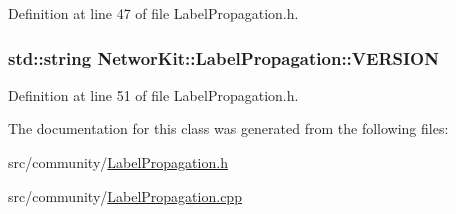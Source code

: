 Definition at line 47 of file Label\-Propagation.\-h.

\hypertarget{class_networ_kit_1_1_label_propagation_a5989d3beabf4c62dfc6d34d5e5a2bfcd}{
\subsubsection[{V\-E\-R\-S\-I\-O\-N}]{\setlength{\rightskip}{0pt plus 5cm}std\-::string Networ\-Kit\-::\-Label\-Propagation\-::\-V\-E\-R\-S\-I\-O\-N}}\label{class_networ_kit_1_1_label_propagation_a5989d3beabf4c62dfc6d34d5e5a2bfcd}


Definition at line 51 of file Label\-Propagation.\-h.



The documentation for this class was generated from the following files\-:\begin{DoxyCompactItemize}
\item 
src/community/\hyperlink{_label_propagation_8h}{Label\-Propagation.\-h}\item 
src/community/\hyperlink{_label_propagation_8cpp}{Label\-Propagation.\-cpp}\end{DoxyCompactItemize}
